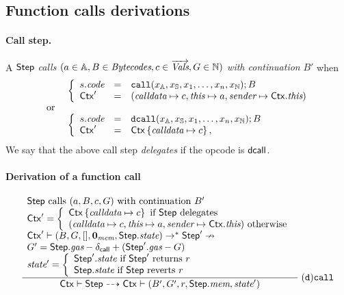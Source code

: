 \subsection{Function calls derivations}

\paragraph{Call step.}
A $\mathsf{Step}$ \emph{calls $(a\in\mathbb{A},B\in\textit{Bytecodes},c\in\overrightarrow{\textit{Vals}},G\in\mathbb{N})$ with continuation} $B'$ when
$$
\begin{array}{ll}
&\left\{
    \begin{array}{lll}
    s.\textit{code} &=&  \mathtt{call}(x_{\mathbb{A}},x_{\mathbb{S}},x_1,\dots,x_n, x_{\mathbb{N}});B \\
    \mathsf{Ctx}' &=&(\textit{calldata}\mapsto c,
     \textit{this}\mapsto a,
     \textit{sender}\mapsto\mathsf{Ctx}.\textit{this})
    \end{array}\right.\\
\hbox{ or }&\\
&\left\{
    \begin{array}{lll}
    s.\textit{code} &=& \mathtt{dcall}(x_{\mathbb{A}},x_{\mathbb{S}},x_1,\dots,x_n, x_{\mathbb{N}});B \\
    \mathsf{Ctx}'&=&\mathsf{Ctx}\left\{\textit{calldata}\mapsto c\right\},
    \end{array}
    \right.
\end{array}
$$
We say that the above call step \emph{delegates} if the opcode is ${\sf dcall}$.

\paragraph{Derivation of a function call}

$$
\dfrac{
	\begin{array}{l}
	\textrm{$\mathsf{Step}$ calls $(a,B,c,G)$ with continuation $B'$} \\
	\mathsf{Ctx}' = \left\{\begin{array}{l}
	\mathsf{Ctx}\left\{\textit{calldata}\mapsto c\right\} \textrm{ if $\mathsf{Step}$ delegates}\\
	(\textit{calldata}\mapsto c,\textit{this}\mapsto a,\textit{sender}\mapsto\mathsf{Ctx}.\textit{this}) \textrm{ otherwise}\\
	\end{array}\right. \\
	\mathsf{Ctx}'\vdash (B,G,[],\mathbf{0}_{\textit{mem}},\mathsf{Step}.\textit{state})\to^* \mathsf{Step}' \nrightarrow \\
	G' = \mathsf{Step}.\textit{gas}-\delta_{\mathsf{call}}+(\mathsf{Step}'.\textit{gas}-G) \\
	\textit{state}' =\left\{
    \begin{array}{l}
        \textrm{$\mathsf{Step}'.\textit{state}$ if $\mathsf{Step}'$ returns $r$}\\
        \textrm{$\mathsf{Step}.\textit{state}$ if $\mathsf{Step}$ reverts $r$}
    \end{array}\right.
	\end{array}
}
{\mathsf{Ctx}\vdash\mathsf{Step} \dashrightarrow \mathsf{Ctx}\vdash (B',G' ,r,\mathsf{Step}.\textit{mem},\textit{state}')}\;\mathtt{(d)call}
$$


